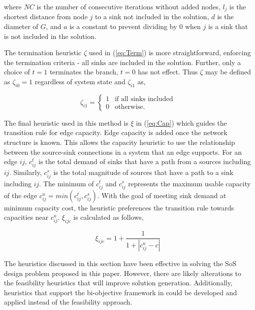 \documentclass[preprint,12pt,authoryear]{elsarticle}
\begin{document}
\noindent where $NC$ is the number of consecutive iterations without added nodes, $l_j$ is the shortest distance from node $j$ to a sink not included in the solution, $d$ is the diameter of $G$, and $a$ is a constant to prevent dividing by $0$ when $j$ is a sink that is not included in the solution. 

The termination heuristic $\zeta$ used in (\ref{eq:Term}) is more straightforward, enforcing the termination criteria - all sinks are included in the solution. Further, only a choice of $t=1$ terminates the branch, $t=0$ has not effect. Thus $\zeta$ may be defined as $\zeta_{i0}=1$ regardless of system state and $\zeta_{i1}$ as,

\begin{equation}
	\zeta_{i1}=\begin{cases}
	1 &\text{if all sinks included}\\
	0 &\text{otherwise.}
	\end{cases}
	\label{eq:zeta}
\end{equation}

The final heuristic used in this method is $\xi$ in (\ref{eq:Cap}) which guides the transition rule for edge capacity. Edge capacity is added once the network structure is known. This allows the capacity heuristic to use the relationship between the source-sink connections in a system that an edge supports. For an edge $ij$, $c^t_{ij}$ is the total demand of sinks that have a path from a sources including $ij$. Similarly, $c^s_{ij}$ is the total magnitude of sources that have a path to a sink including $ij$. The minimum of $c^t_{ij}$ and $c^s_{ij}$ represents the maximum usable capacity of the edge $c^u_{ij}=min(c^t_{ij},c^s_{ij})$. With the goal of meeting sink demand at minimum capacity cost, the heuristic preferences the transition rule towards capacities near $c^u_{ij}$. $\xi_{ijc}$ is calculated as follows,

\begin{equation}
	\xi_{ijc}=1+\frac{1}{1+|c^u_{ij}-c|}
	\label{eq:xi}
\end{equation}

The heuristics discussed in this section have been effective in solving the SoS design problem proposed in this paper. However, there are likely alterations to the feasibility heuristics that will improve solution generation. Additionally, heuristics that support the bi-objective framework in \cite{Iredi2001} could be developed and applied instead of the feasibility approach.
\end{document}
